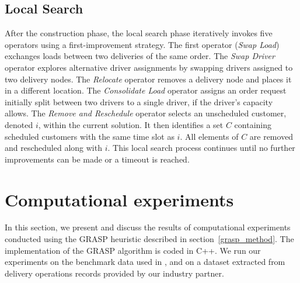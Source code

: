 \documentclass{article}
\begin{document}
\subsection{Local Search}

After the construction phase, the local search phase iteratively invokes five operators using a first-improvement strategy. The first operator (\textit{Swap Load}) exchanges loads between two deliveries of the same order. The \textit{Swap Driver} operator explores alternative driver assignments by swapping drivers assigned to two delivery nodes. The \textit{Relocate} operator removes a delivery node and places it in a different location. The \textit{Consolidate Load} operator assigns an order request initially split between two drivers to a single driver, if the driver's capacity allows. The \textit{Remove and Reschedule} operator selects an unscheduled customer, denoted $i$, within the current solution. It then identifies a set $C$ containing scheduled customers with the same time slot as $i$. All elements of $C$ are removed and rescheduled along with $i$. This local search process continues until no further improvements can be made or a timeout is reached.




\section{Computational experiments}
\label{comp_exp}

In this section, we present and discuss the results of computational experiments conducted using the GRASP heuristic described in section~\ref{grasp_method}. The implementation of the GRASP algorithm is coded in C++. We run our experiments on the benchmark data used in \cite{kinable2014concrete}, and on a dataset extracted from delivery operations records provided by our industry partner.
\end{document}
